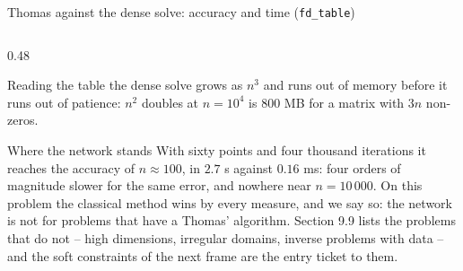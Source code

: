 \documentclass[10pt,aspectratio=169]{beamer}
\begin{document}
\begin{frame}{Thomas against the dense solve: accuracy and time (\texttt{fd\_table})}
\begin{columns}[T]
\begin{column}{0.48\textwidth}
\begin{block}{Reading the table}
the dense solve grows as $n^{3}$ and runs out of memory before it runs out
of patience: $n^{2}$ doubles at $n=10^{4}$ is $800$ MB for a matrix with
$3n$ non-zeros.
\end{block}
\begin{block}{Where the network stands}
\scriptsize
With sixty points and four thousand iterations it reaches the accuracy of
$n\approx100$, in $2.7$ s against $0.16$ ms: four orders of magnitude
slower for the same error, and nowhere near $n=10\,000$.  On this problem
the classical method wins by every measure, and we say so: the network is
not for problems that have a Thomas' algorithm.  Section 9.9 lists the
problems that do not -- high dimensions, irregular domains, inverse
problems with data -- and the soft constraints of the next frame are the
entry ticket to them.
\end{block}
\end{column}
\end{columns}
\end{frame}
\end{document}
